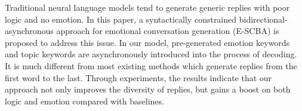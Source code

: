 Traditional neural language models tend to generate generic replies with poor logic and no emotion. In this paper, a syntactically constrained bidirectional-asynchronous approach for emotional conversation generation (E-SCBA) is proposed to address this issue. In our model, pre-generated emotion keywords and topic keywords are asynchronously introduced into the process of decoding. It is much different from most existing methods which generate replies from the first word to the last. Through experiments, the results indicate that our approach not only improves the diversity of replies, but gains a boost on both logic and emotion compared with baselines.
